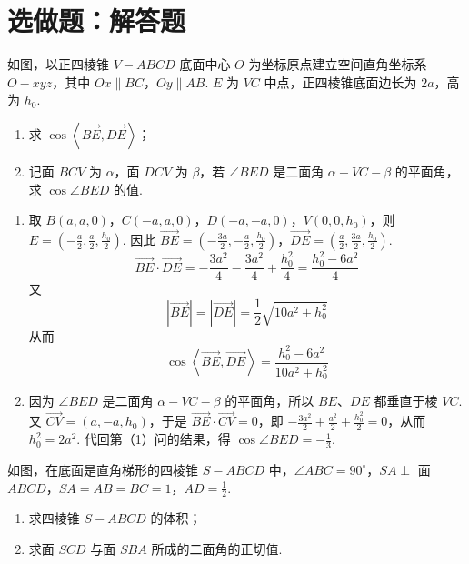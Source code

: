 \section{选做题：解答题}

\begin{problem}
如图，以正四棱锥 \(V-ABCD\) 底面中心 \(O\) 为坐标原点建立空间直角坐标系 \(O-xyz\)，其中 \(Ox \parallel BC\)，\(Oy \parallel AB\). \(E\) 为 \(VC\) 中点，正四棱锥底面边长为 \(2a\)，高为 \(h_0\).

\begin{enumerate}
\item 求 \(\cos\left\langle \overrightarrow{BE},\overrightarrow{DE} \right\rangle\)；
\item 记面 \(BCV\) 为 \(\alpha\)，面 \(DCV\) 为 \(\beta\)，若 \(\angle BED\) 是二面角 \(\alpha-VC-\beta\) 的平面角，求 \(\cos\angle BED\) 的值.
\end{enumerate}

\end{problem}

\begin{solution}
\begin{enumerate}
\item 取 \(B(a,a,0)\)，\(C(-a,a,0)\)，\(D(-a,-a,0)\)，\(V(0,0,h_0)\)，则 \(E=(-\frac{a}{2},\frac{a}{2},\frac{h_0}{2})\). 因此 \(\overrightarrow{BE}=\left(-\frac{3a}{2},-\frac a2,\frac{h_0}{2}\right)\)，\(\overrightarrow{DE}=\left(\frac a2,\frac{3a}{2},\frac{h_0}{2}\right)\).
\[
\overrightarrow{BE}\cdot\overrightarrow{DE}=-\frac{3a^2}{4}-\frac{3a^2}{4}+\frac{h_0^2}{4}=\frac{h_0^2-6a^2}{4}
\]
又
\[
|\overrightarrow{BE}|=|\overrightarrow{DE}|=\frac12\sqrt{10a^2+h_0^2}
\]
从而
\[
\cos\left\langle\overrightarrow{BE},\overrightarrow{DE}\right\rangle=\frac{h_0^2-6a^2}{10a^2+h_0^2}
\]

\item 因为 \(\angle BED\) 是二面角 \(\alpha-VC-\beta\) 的平面角，所以 \(BE\)、\(DE\) 都垂直于棱 \(VC\). 又 \(\overrightarrow{CV}=(a,-a,h_0)\)，于是
\(\overrightarrow{BE}\cdot\overrightarrow{CV}=0\)，即
\(-\frac{3a^2}{2}+\frac{a^2}{2}+\frac{h_0^2}{2}=0\)，从而 \(h_0^2=2a^2\). 代回第（1）问的结果，得 \(\cos\angle BED=-\frac13\).
\end{enumerate}
\end{solution}

\begin{problem}
如图，在底面是直角梯形的四棱锥 \(S-ABCD\) 中，\(\angle ABC = 90^\circ\)，\(SA \perp\) 面 \(ABCD\)，\(SA = AB = BC = 1\)，\(AD = \frac{1}{2}\).

\begin{enumerate}
\item 求四棱锥 \(S-ABCD\) 的体积；
\item 求面 \(SCD\) 与面 \(SBA\) 所成的二面角的正切值.
\end{enumerate}

\end{problem}

